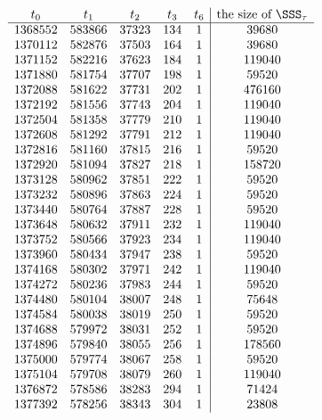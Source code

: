 $$
\begin{array}{ccccc|c}
t_{0}&t_{1}&t_{2}&t_{3}&t_{6}& \textrm{the size of $\SSS_{\tau}$}\\
\hline 
1368552 & 583866 & 37323 & 134 & 1 & 39680\\
1370112 & 582876 & 37503 & 164 & 1 & 39680\\
1371152 & 582216 & 37623 & 184 & 1 & 119040\\
1371880 & 581754 & 37707 & 198 & 1 & 59520\\
1372088 & 581622 & 37731 & 202 & 1 & 476160\\
1372192 & 581556 & 37743 & 204 & 1 & 119040\\
1372504 & 581358 & 37779 & 210 & 1 & 119040\\
1372608 & 581292 & 37791 & 212 & 1 & 119040\\
1372816 & 581160 & 37815 & 216 & 1 & 59520\\
1372920 & 581094 & 37827 & 218 & 1 & 158720\\
1373128 & 580962 & 37851 & 222 & 1 & 59520\\
1373232 & 580896 & 37863 & 224 & 1 & 59520\\
1373440 & 580764 & 37887 & 228 & 1 & 59520\\
1373648 & 580632 & 37911 & 232 & 1 & 119040\\
1373752 & 580566 & 37923 & 234 & 1 & 119040\\
1373960 & 580434 & 37947 & 238 & 1 & 59520\\
1374168 & 580302 & 37971 & 242 & 1 & 119040\\
1374272 & 580236 & 37983 & 244 & 1 & 59520\\
1374480 & 580104 & 38007 & 248 & 1 & 75648\\
1374584 & 580038 & 38019 & 250 & 1 & 59520\\
1374688 & 579972 & 38031 & 252 & 1 & 59520\\
1374896 & 579840 & 38055 & 256 & 1 & 178560\\
1375000 & 579774 & 38067 & 258 & 1 & 59520\\
1375104 & 579708 & 38079 & 260 & 1 & 119040\\
1376872 & 578586 & 38283 & 294 & 1 & 71424\\
1377392 & 578256 & 38343 & 304 & 1 & 23808\\
\end{array}
$$
